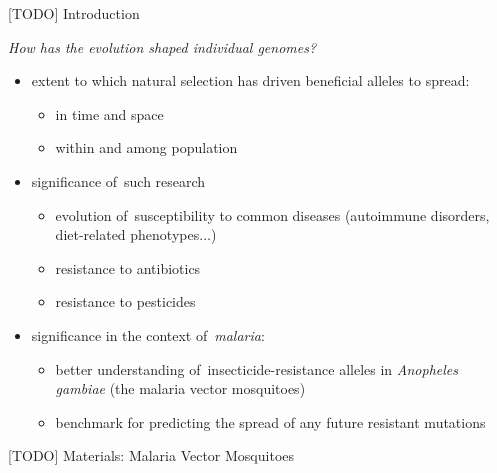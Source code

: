 \documentclass[final,hyperref={pdfpagelabels=false}]{beamer}
\begin{document}
\begin{frame}[t]
\begin{columns}[t]
\begin{column}{.465\textwidth}
\begin{block}{[TODO] Introduction}

\emph{How has the evolution shaped individual genomes?}

\begin{itemize}
\item extent to which natural selection has driven beneficial alleles to spread:
    \begin{itemize}
    \item in time and space
    \item within and among population
    \end{itemize}
\end{itemize}

\begin{itemize}
    \item significance of~such research
    \begin{itemize}
    	\item evolution of~susceptibility to common diseases (autoimmune disorders, diet-related phenotypes$\dots$)
    	\item resistance to antibiotics
    	\item resistance to pesticides
    \end{itemize}
\end{itemize}

\begin{itemize}
\item significance in the context of~\emph{malaria}:
    \begin{itemize}
	\item better understanding  of~insecticide-resistance alleles in \emph{Anopheles gambiae} (the malaria vector mosquitoes)
	\item benchmark for predicting the spread of any future resistant mutations
    \end{itemize}
\end{itemize}
\end{block}


\begin{block}{[TODO] Materials: Malaria Vector Mosquitoes}


\end{block}
\end{column}
\end{columns}
\end{frame}
\end{document}
